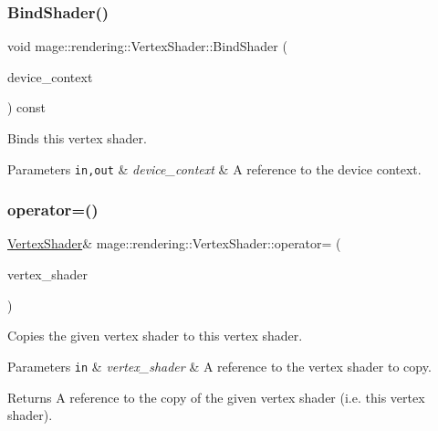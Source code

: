 \subsubsection{\texorpdfstring{Bind\+Shader()}{BindShader()}}
{\footnotesize\ttfamily void mage\+::rendering\+::\+Vertex\+Shader\+::\+Bind\+Shader (\begin{DoxyParamCaption}\item[{I\+D3\+D11\+Device\+Context \&}]{device\+\_\+context }\end{DoxyParamCaption}) const\hspace{0.3cm}{\ttfamily [noexcept]}}

Binds this vertex shader.


\begin{DoxyParams}[1]{Parameters}
\mbox{\tt in,out}  & {\em device\+\_\+context} & A reference to the device context. \\
\hline
\end{DoxyParams}
\mbox{\label{classmage_1_1rendering_1_1_vertex_shader_a4dff0bd19a0242300fbde0cc0a4497c4}} 
\subsubsection{\texorpdfstring{operator=()}{operator=()}\hspace{0.1cm}{\footnotesize\ttfamily [1/2]}}
{\footnotesize\ttfamily \mbox{\hyperlink{classmage_1_1rendering_1_1_vertex_shader}{Vertex\+Shader}}\& mage\+::rendering\+::\+Vertex\+Shader\+::operator= (\begin{DoxyParamCaption}\item[{const \mbox{\hyperlink{classmage_1_1rendering_1_1_vertex_shader}{Vertex\+Shader}} \&}]{vertex\+\_\+shader }\end{DoxyParamCaption})\hspace{0.3cm}{\ttfamily [delete]}}

Copies the given vertex shader to this vertex shader.


\begin{DoxyParams}[1]{Parameters}
\mbox{\tt in}  & {\em vertex\+\_\+shader} & A reference to the vertex shader to copy. \\
\hline
\end{DoxyParams}
\begin{DoxyReturn}{Returns}
A reference to the copy of the given vertex shader (i.\+e. this vertex shader). 
\end{DoxyReturn}
\mbox{\label{classmage_1_1rendering_1_1_vertex_shader_a2d63073a65a136f2afa898af67eedb8b}} 
